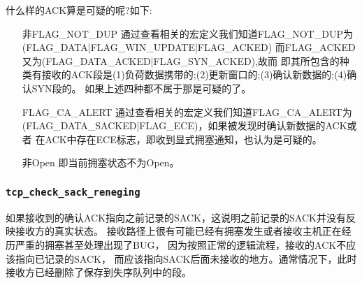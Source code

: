     什么样的ACK算是可疑的呢?如下:
\begin{enumerate}
\item[非FLAG\_NOT\_DUP] 通过查看相关的宏定义我们知道FLAG\_NOT\_DUP为(FLAG\_DATA|FLAG\_WIN\_UPDATE|FLAG\_ACKED)
                        而FLAG\_ACKED又为(FLAG\_DATA\_ACKED|FLAG\_SYN\_ACKED),故而
                        即其所包含的种类有接收的ACK段是(1)负荷数据携带的;(2)更新窗口的;(3)确认新数据的;(4)确认SYN段的。
                        如果上述四种都不属于那是可疑的了。
            
\item[FLAG\_CA\_ALERT]  通过查看相关的宏定义我们知道FLAG\_CA\_ALERT为(FLAG\_DATA\_SACKED|FLAG\_ECE)，如果被发现时确认新数据的ACK或者
                        在ACK中存在ECE标志，即收到显式拥塞通知，也认为是可疑的。\color{red}{似乎和上面的有矛盾，}
\item[非Open]           即当前拥塞状态不为Open。
\end{enumerate}
        \subsubsection{\texttt{tcp_check_sack_reneging}}
            如果接收到的确认ACK指向之前记录的SACK，这说明之前记录的SACK并没有反映接收方的真实状态。
            接收路径上很有可能已经有拥塞发生或者接收主机正在经历严重的拥塞甚至处理出现了BUG，
            因为按照正常的逻辑流程，接收的ACK不应该指向已记录的SACK，
            而应该指向SACK后面未接收的地方。通常情况下，此时接收方已经删除了保存到失序队列中的段。
            
